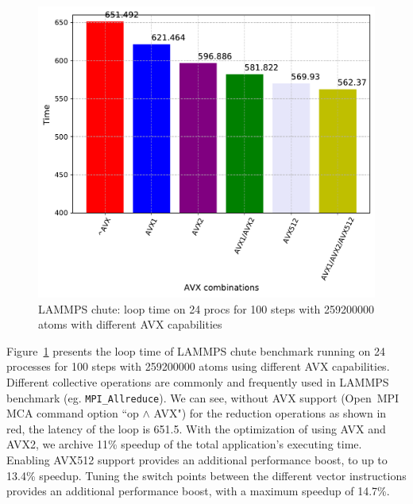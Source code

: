 \documentclass[5p,times,twocolumn]{elsarticle}
\newcommand{\mpifunc}[1]{\lstinline"MPI_#1"\xspace}
\newcommand{\ompi}[0]{Open~MPI\xspace}
\begin{document}
\begin{figure}[h]
    \centering
    \includegraphics[width=\linewidth]{lammps_avx_review.pdf}
    \caption{LAMMPS chute: loop time on 24 procs for 100 steps with 259200000 atoms with different AVX capabilities}
    \label{fig:lammpsavx}
\end{figure}

Figure~\ref{fig:lammpsavx} presents the loop time of LAMMPS chute benchmark running
on 24 processes for 100 steps with 259200000 atoms using different AVX capabilities.
Different collective operations are commonly and frequently used in LAMMPS benchmark (eg. \mpifunc{Allreduce}).
We can see, without AVX support (\ompi MCA command option ``op $\wedge$ AVX") for the reduction operations as shown in red, the latency of the loop is 651.5.
With the optimization of using AVX and AVX2, we archive 11\% speedup of the total application's executing time. Enabling  AVX512 support provides an additional performance boost, to up to 13.4\% speedup. Tuning the switch points between the different vector instructions provides an additional performance boost, with a maximum speedup of 14.7\%.
\end{document}

